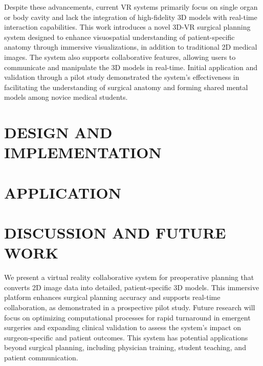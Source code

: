\documentclass[manuscript]{acmart} %
\begin{document}

Despite these advancements, current VR systems primarily focus on single organ or body cavity and lack the integration of high-fidelity 3D models with real-time interaction capabilities. This work introduces a novel 3D-VR surgical planning system designed to enhance visuospatial understanding of patient-specific anatomy through immersive visualizations, in addition to traditional 2D medical images. The system also supports collaborative features, allowing users to communicate and manipulate the 3D models in real-time. Initial application and validation through a pilot study demonstrated the system's effectiveness in facilitating the understanding of surgical anatomy and forming shared mental models among novice medical students.


\section{DESIGN AND IMPLEMENTATION}


\section{APPLICATION}


\section{DISCUSSION AND FUTURE WORK}
We present a virtual reality collaborative system for preoperative planning that converts 2D image data into detailed, patient-specific 3D models. This immersive platform enhances surgical planning accuracy and supports real-time collaboration, as demonstrated in a prospective pilot study. Future research will focus on optimizing computational processes for rapid turnaround in emergent surgeries and expanding clinical validation to assess the system's impact on surgeon-specific and patient outcomes. This system has potential applications beyond surgical planning, including physician training, student teaching, and patient communication.




\appendix
\end{document}

